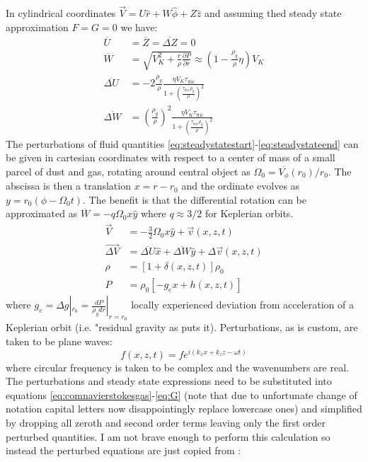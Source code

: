 \documentclass[12pt]{article}
\begin{document}
In cylindrical coordinates $\vec{V} = U\hat r + W\hat\phi + Z\hat z$ and assuming thed steady state approximation $F=G=0$ we have:
\begin{align}
    \label{eq:steadystatestart}
    \overline{U} &= \overline{Z} = \overline{\Delta Z} = 0 \\
    \overline{W} &= \sqrt{ V_K^2 + \frac{r}{\rho}\frac{\partial P}{\partial r} } \approx \left( 1-\frac{\rho_g}{\rho}\eta\right)V_K \\
    \overline{\Delta U} &= -2 \frac{\rho_g}{\rho} \frac{\eta V_K\tau_\mathrm{fric}}{1 + \left(\frac{\tau_\mathrm{fric}\rho_g}{\rho}\right)^2 } \\
    \overline{\Delta W} &= \left(\frac{\rho_g}{\rho}\right)^2 \frac{\eta V_K\tau_\mathrm{fric}}{1 + \left(\frac{\tau_\mathrm{fric}\rho_g}{\rho}\right)^2 }
    \label{eq:steadystateend}
\end{align}
The perturbations of fluid quantities \ref{eq:steadystatestart}-\ref{eq:steadystateend} can be given in cartesian coordinates with respect to a center of mass of a small parcel of dust and gas, rotating around central object as $\Omega_0 = \overline{V_\phi}(r_0)/r_0$. The abscissa is then a translation $x=r-r_0$ and the ordinate evolves as $y=r_0(\phi-\Omega_0t)$. The benefit is that the differential rotation can be approximated as $\overline{W} = -q\Omega_0x\hat y$ where $q\approx 3/2$ for Keplerian orbits. 
\begin{align}
    \vec{V} &= -\frac{3}{2}\Omega_0x\hat{y} + \vec{v}(x,z,t) \\
    \vec{\Delta V} &= \overline{\Delta U}\hat x + \overline{\Delta W}\hat y + \Delta\vec{v}(x,z,t)\\
    \rho &= [1+\delta(x,z,t)]\rho_0 \\
    P &= \rho_0[-g_ex + h(x,z,t)]
\end{align}
where $g_e = \Delta g|_{r_0} = \frac{dP}{\rho_gdr}|_{r=r_0}$ locally experienced deviation from acceleration of a Keplerian orbit (i.e. "residual gravity as \cite{Weidenschilling77} puts it). Perturbations, as is custom, are taken to be plane waves: 
\begin{equation}
f(x,z,t) = fe^{i(k_xx + k_zz - \omega t)}
\end{equation}
where circular frequency is taken to be complex and the wavenumbers are real. The perturbations and steady state expressions need to be substituted into equations \ref{eq:comnavierstokesgas}-\ref{eq:G} (note that due to unfortunate change of notation capital letters now disappointingly replace lowercase ones) and simplified by dropping all zeroth and second order terms leaving only the first order perturbed quantities. I am not brave enough to perform this calculation so instead the perturbed equations are just copied from \cite{Youdin05}:
\end{document}
